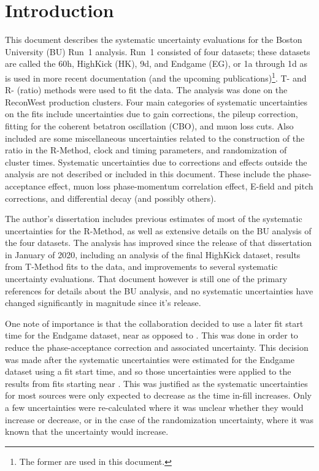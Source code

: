 
\graphicspath{}

\section{Introduction}


This document describes the systematic uncertainty evaluations for the Boston University (BU) Run~1 \wa analysis. Run~1 consisted of four datasets; these datasets are called the 60h, HighKick (HK), 9d, and Endgame (EG), or 1a through 1d as is used in more recent documentation (and the upcoming publications)\footnote{The former are used in this document.}. T- and R- (ratio) methods were used to fit the data. The analysis was done on the ReconWest production clusters. Four main categories of systematic uncertainties on the \wa fits include uncertainties due to gain corrections, the pileup correction, fitting for the coherent betatron oscillation (CBO), and muon loss cuts. Also included are some miscellaneous uncertainties related to the construction of the ratio in the R-Method, clock and timing parameters, and randomization of cluster times. Systematic uncertainties due to corrections and effects outside the \wa analysis are not described or included in this document. These include the phase-acceptance effect, muon loss phase-momentum correlation effect, E-field and pitch corrections, and differential decay (and possibly others).

The author's dissertation \cite{phdthesis:2020Kinnaird} includes previous estimates of most of the systematic uncertainties for the R-Method, as well as extensive details on the BU analysis of the four datasets. The analysis has improved since the release of that dissertation in January of 2020, including an analysis of the final HighKick dataset, results from T-Method fits to the data, and improvements to several systematic uncertainty evaluations. That document however is still one of the primary references for details about the BU \wa analysis, and no systematic uncertainties have changed significantly in magnitude since it's release.

One note of importance is that the collaboration decided to use a later fit start time for the Endgame dataset, near  as opposed to . This was done in order to reduce the phase-acceptance correction and associated uncertainty. This decision was made after the systematic uncertainties were estimated for the Endgame dataset using a  fit start time, and so those uncertainties were applied to the results from fits starting near . This was justified as the systematic uncertainties for most sources were only expected to decrease as the time in-fill increases. Only a few uncertainties were re-calculated where it was unclear whether they would increase or decrease, or in the case of the randomization uncertainty, where it was known that the uncertainty would increase.

